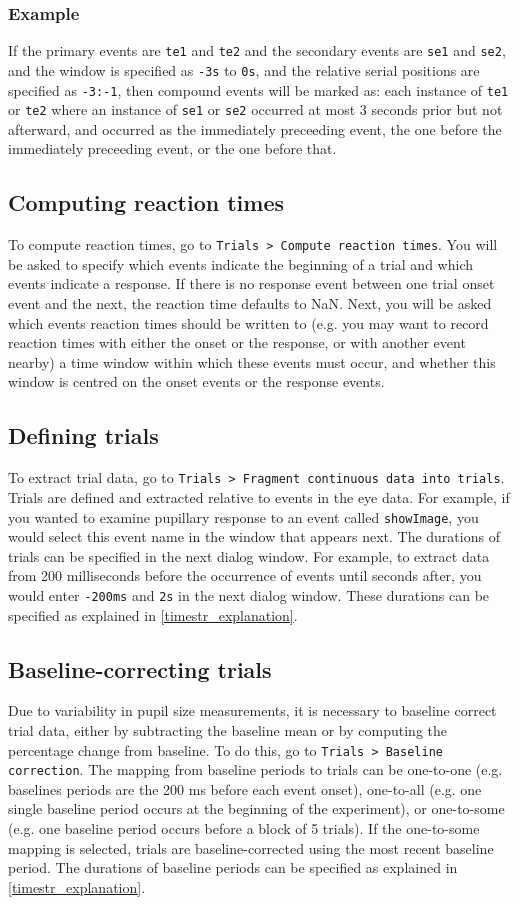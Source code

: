 \documentclass{article}
\newcommand{\erp}{Trials }
\begin{document}
\subsubsection{Example}
If the primary events are \texttt{te1} and \texttt{te2} and the secondary events are \texttt{se1} and \texttt{se2}, and the window is specified as \texttt{-3s} to \texttt{0s}, and the relative serial positions are specified as \texttt{-3:-1}, then compound events will be marked as: each instance of \texttt{te1} or \texttt{te2} where an instance of \texttt{se1} or \texttt{se2} occurred at most 3 seconds prior but not afterward, and occurred as the immediately preceeding event, the one before the immediately preceeding event, or the one before that.
\subsection{Computing reaction times}
To compute reaction times, go to \texttt{Trials > Compute reaction times}. You will be asked to specify which events indicate the beginning of a trial and which events indicate a response. If there is no response event between one trial onset event and the next, the reaction time defaults to NaN. Next, you will be asked which events reaction times should be written to (e.g. you may want to record reaction times with either the onset or the response, or with another event nearby) a time window within which these events must occur, and whether this window is centred on the onset events or the response events.
\subsection{Defining trials}
To extract trial data, go to \texttt{\erp > Fragment continuous data into trials}. Trials are defined and extracted relative to events in the eye data. For example, if you wanted to examine pupillary response to an event called \texttt{showImage}, you would select this event name in the window that appears next. The durations of trials can be specified in the next dialog window. For example, to extract data from 200 milliseconds before the occurrence of events until seconds after, you would enter \texttt{-200ms} and \texttt{2s} in the next dialog window. These durations can be specified as explained in \ref{timestr_explanation}.
\subsection{Baseline-correcting trials}
Due to variability in pupil size measurements, it is necessary to baseline correct trial data, either by subtracting the baseline mean or by computing the percentage change from baseline. To do this, go to \texttt{\erp > Baseline correction}. The mapping from baseline periods to trials can be one-to-one (e.g. baselines periods are the 200 ms before each event onset), one-to-all (e.g. one single baseline period occurs at the beginning of the experiment), or one-to-some (e.g. one baseline period occurs before a block of 5 trials). If the one-to-some mapping is selected, trials are baseline-corrected using the most recent baseline period. The durations of baseline periods can be specified as explained in \ref{timestr_explanation}.
\end{document}
